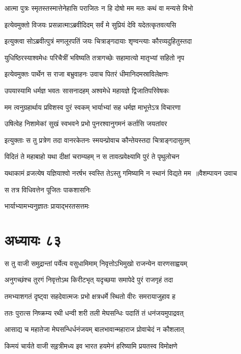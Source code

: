 \twolineshloka
{आत्मा पुत्रः स्मृतस्तस्मात्तेनेहासि पराजितः}
{न हि दोषो मम मतः कथं वा मन्यसे विभो}


\twolineshloka
{इत्येवमुक्तो विजयः प्रसन्नात्माऽब्रवीदिदम्}
{सर्वं मे सुप्रियं देवि यदेतत्कृतवत्यसि}


\twolineshloka
{इत्युक्त्वा सोऽब्रवीत्पुत्रं मणलूरपतिं जयः}
{चित्राङ्गदायाः शृण्वन्त्याः कौरव्यदुहितुस्तदा}


\twolineshloka
{युधिष्ठिरस्याश्वमेधः परिचैत्रीं भविष्यति}
{तत्रागच्छेः सहामात्यो मातृभ्यां सहितो नृप}


\twolineshloka
{इत्येवमुक्तः पार्थेन स राजा बभ्रुवाहनः}
{उवाच पितरं धीमानिदमस्राविलेक्षणः}


\twolineshloka
{उपयास्यामि धर्मज्ञ भवतः सासनादहम्}
{अश्वमेधे महायज्ञे द्विजातिपरिवेषकः}


\twolineshloka
{मम त्वनुग्रहार्थाय प्रविशस्व पुरं स्वकम्}
{भार्याभ्यां सह धर्मज्ञ माभूत्तेऽत्र विचारणा}


\twolineshloka
{उषित्वेह निशामेकां सुखं स्वभवने प्रभो}
{पुनरश्वानुगमनं कर्तासि जयतांवर}


\twolineshloka
{इत्युक्ताः स तु प्रत्रेण तदा वानरकेतनः}
{स्मयन्प्रोवाच कौन्तेयस्तदा चित्राङ्गदासुतम्}


\twolineshloka
{विदितं ते महाबाहो यथा दीक्षां चराम्यहम्}
{न स तावत्प्रवेक्ष्यामि पुरं ते पृथुलोचन}


\threelineshloka
{यथाकामं व्रजत्येष यज्ञियाश्वो नरर्षभ}
{स्वस्ति तेऽस्तु गमिष्यामि न स्थानं विद्यते मम ॥वैशम्पायन उवाच}
{}


\twolineshloka
{स तत्र विधिवत्तेन पूजितः पाकशासनिः}
{}


भार्याभ्यामभ्यनुज्ञातः प्रायाद्भरतसत्तमः
\chapter{अध्यायः ८३}
\twolineshloka
{स तु वाजी समुद्रान्तां पर्येत्य वसुधामिमाम्}
{निवृत्तोऽभिमुखो राजन्येन वारणसाह्वयम्}


\twolineshloka
{अनुगच्छंश्च तुरगं निवृत्तोऽथ किरीटभृत्}
{यदृच्छया समापेदे पुरं राजगृहं तदा}


\twolineshloka
{तमभ्याशगतं दृष्ट्वा सहदेवात्मजः प्रभो}
{क्षत्रधर्मे स्थितो वीरः समरायाजुहाव ह}


\twolineshloka
{ततः पुरात्स निष्क्रम्य रथी धन्वी शरी तली}
{मेघसन्धिः पदातिं तं धनंजयमुपाद्रवत्}


\twolineshloka
{आसाद्य च महातेजा मेघसन्धिर्धनंजयम्}
{बालभावान्महाराज प्रोवाचेदं न कौशलात्}


\twolineshloka
{किमयं चार्यते वाजी स्इत्रीमध्य इव भारत}
{हयमेनं हरिष्यामि प्रयतस्व विमोक्षणे}



